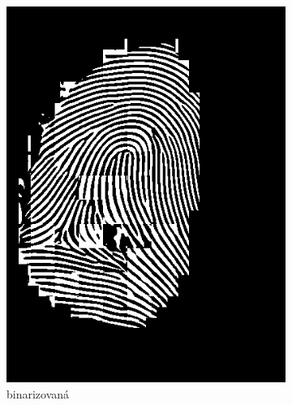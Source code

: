 \begin{figure}[h]
\begin{subfigure}[b]{0.3\linewidth}
      \includegraphics[width=\linewidth]{obrazky-figures/gabor_filtered_binarized.png}
      \caption{binarizovaná}
      \label{obr:gabor_binar}
    \end{subfigure}
    \hfill
    \begin{subfigure}[b]{0.3\linewidth}

\end{subfigure}
\end{figure}
